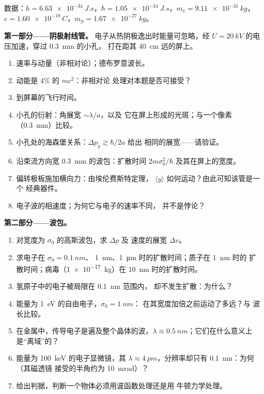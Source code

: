 \begin{problem}\label{pb:b2:schrodinger-wave-functions:1}
数据：$h = \qty{6.63e-34}{J.s}$，$\hbar = \qty{1.05e-34}{J.s}$，$m_{\text{e}} =
\qty{9.11e-31}{kg}$，$e = \qty{1.60e-19}{C}$，$m_{\text{p}} = \qty{1.67e-27}{kg}$。

\textbf{第一部分——阴极射线管。}
电子从热阴极逸出时能量可忽略，经
$U = \qty{20}{kV}$ 的电压加速，穿过 \qty{0.3}{mm} 的小孔，
打在距其 \qty{40}{cm} 远的屏上。
\begin{enumerate}
  \item 速率与动量（非相对论）；德布罗意波长。
  \item 动能是 $4\%$ 的 $mc^2$：非相对论
        处理对本题是否可接受？
  \item 到屏幕的飞行时间。
  \item 小孔的衍射：角展宽 $\sim\lambda/a$，以及
        它在屏上形成的光斑；与一个像素
        （\qty{0.3}{mm}）比较。
  \item 小孔处的海森堡关系：$\Delta p_y \gtrsim \hbar/2a$ 给出
        相同的展宽——请验证。
  \item 沿束流方向宽 \qty{0.3}{mm} 的波包：扩散时间
        $2m\sigma_0^2/\hbar$ 及其在屏上的宽度。
  \item 偏转极板施加横向力：由埃伦费斯特定理，
        $\langle y\rangle$ 如何运动？由此可知该管是一个
        经典器件。
  \item 电子波的相速度；为何它与电子的速率不同，
        并不是悖论？
\end{enumerate}

\textbf{第二部分——波包。}
\begin{enumerate}[resume]
  \item 对宽度为 $\sigma_0$ 的高斯波包，求 $\Delta p$ 及
        速度的展宽 $\Delta v$。
  \item 求电子在 $\sigma_0 = \qty{0.1}{nm}$、
        \qty{1}{nm}、\qty{1}{\micro m} 时的扩散时间；质子在 \qty{1}{nm} 时的
        扩散时间；病毒（\qty{1e-17}{kg}）在 \qty{10}{nm} 时的扩散时间。
  \item 氢原子中的电子被局限在 \qty{0.1}{nm} 范围内，
        却不发生扩散：为什么？
  \item 能量为 \qty{1}{eV} 的自由电子，$\sigma_0 = \qty{1}{nm}$：
        在其宽度加倍之前运动了多远？与
        波长比较。
  \item 在金属中，传导电子是遍及整个晶体的波，$\lambda \approx
        \qty{0.5}{nm}$；它们在什么意义上
        是“离域”的？
  \item 能量为 \qty{100}{keV} 的电子显微镜，其 $\lambda \approx
        \qty{4}{pm}$，分辨率却只有 \qty{0.1}{nm}：为何（其磁透镜
        接受的半角约为 \qty{10}{mrad}）？
  \item 给出判据，判断一个物体必须用波函数处理还是用
        牛顿力学处理。
\end{enumerate}


\end{problem}
